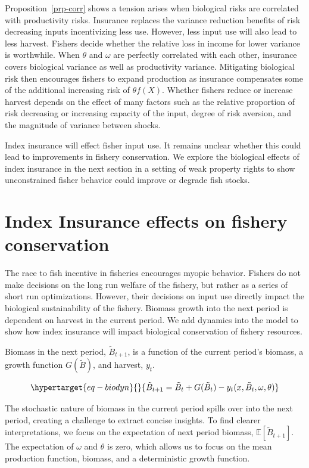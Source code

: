 \documentclass[
  letterpaper,
  DIV=11,
  numbers=noendperiod]{scrartcl}
\theoremstyle{plain}
\theoremstyle{plain}
\theoremstyle{remark}
\begin{document}
Proposition~\ref{prp-corr} shows a tension arises when biological risks
are correlated with productivity risks. Insurance replaces the variance
reduction benefits of risk decreasing inputs incentivizing less use.
However, less input use will also lead to less harvest. Fishers decide
whether the relative loss in income for lower variance is worthwhile.
When \(\theta\) and \(\omega\) are perfectly correlated with each other,
insurance covers biological variance as well as productivity variance.
Mitigating biological risk then encourages fishers to expand production
as insurance compensates some of the additional increasing risk of
\(\theta f(X)\). Whether fishers reduce or increase harvest depends on
the effect of many factors such as the relative proportion of risk
decreasing or increasing capacity of the input, degree of risk aversion,
and the magnitude of variance between shocks.

Index insurance will effect fisher input use. It remains unclear whether
this could lead to improvements in fishery conservation. We explore the
biological effects of index insurance in the next section in a setting
of weak property rights to show unconstrained fisher behavior could
improve or degrade fish stocks.

\hypertarget{sec-bio}{%
\section{Index Insurance effects on fishery
conservation}\label{sec-bio}}

The race to fish incentive in fisheries encourages myopic behavior.
Fishers do not make decisions on the long run welfare of the fishery,
but rather as a series of short run optimizations. However, their
decisions on input use directly impact the biological sustainability of
the fishery. Biomass growth into the next period is dependent on harvest
in the current period. We add dynamics into the model to show how index
insurance will impact biological conservation of fishery resources.

Biomass in the next period, \(\tilde{B}_{t+1}\), is a function of the
current period's biomass, a growth function \(G(\tilde{B})\), and
harvest, \(y_t\).

\begin{equation}\protect\hypertarget{eq-biodyn}{}{
\tilde{B}_{t+1}=\tilde{B}_t+G(\tilde{B}_t)- y_t(x,\tilde{B}_t,\omega,\theta)
}\label{eq-biodyn}\end{equation}

The stochastic nature of biomass in the current period spills over into
the next period, creating a challenge to extract concise insights. To
find clearer interpretations, we focus on the expectation of next period
biomass, \(\mathbb{E}[\tilde{B}_{t+1}]\). The expectation of \(\omega\)
and \(\theta\) is zero, which allows us to focus on the mean production
function, biomass, and a deterministic growth function.
\end{document}
